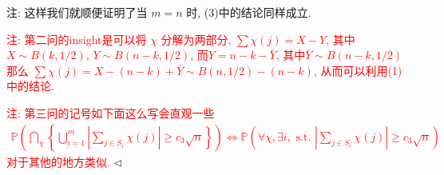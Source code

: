 \documentclass[11pt]{article}
\newenvironment{answer}[1][Solution]{\begin{trivlist}
    \item[\hskip \labelsep {\bfseries #1.}\hskip \labelsep]}{\hfill$\lhd$\end{trivlist}}
\newcommand\1{\mathds{1}}
\newcommand\PP{\mathbb{P}}
\begin{document}
\begin{answer}
\begin{enumerate}[label=(\arabic*)]
        注: 这样我们就顺便证明了当 $m=n$ 时, (3)中的结论同样成立.
    \end{enumerate}

    \textcolor{red}{注: 第二问的insight是可以将 $\chi$ 分解为两部分, $\sum \chi(j) = X-Y$, 其中$X\sim B(k,1/2)$, $Y\sim B(n-k,1/2)$, 而$Y = n-k - \bar{Y}$, 其中$\bar{Y}\sim B(n-k,1/2)$ 那么 $\sum \chi(j) = X - (n-k) + \bar{Y} \sim B(n,1/2) - (n-k)$, 从而可以利用(1)中的结论.} 

    \textcolor{red}{注: 第三问的记号如下面这么写会直观一些
    \begin{align*}
        \PP\left( \bigcap_\chi \left\{\bigcup_{i=1}^m\left|\sum_{j\in S_i} \chi(j)\right| \ge c_3 \sqrt{n}\right\}\right) \iff \PP\left( \forall \chi, \exists i, \text{ s.t. } \left|\sum_{j\in S_i} \chi(j)\right| \ge c_3 \sqrt{n}\right)
    \end{align*}
    对于其他的地方类似.}
\end{answer}
\end{document}
